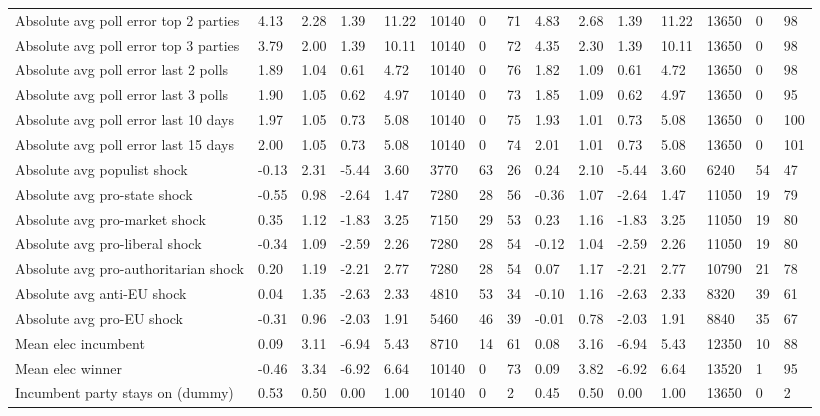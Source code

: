 \begin{longtable}{lllllllllllllll}
Absolute avg poll error top 2 parties & 4.13 & 2.28 & 1.39 & 11.22 & 10140 & 0 & 71 & 4.83 & 2.68 & 1.39 & 11.22 & 13650 & 0 & 98\\
Absolute avg poll error top 3 parties & 3.79 & 2.00 & 1.39 & 10.11 & 10140 & 0 & 72 & 4.35 & 2.30 & 1.39 & 10.11 & 13650 & 0 & 98\\
Absolute avg poll error last 2 polls & 1.89 & 1.04 & 0.61 & 4.72 & 10140 & 0 & 76 & 1.82 & 1.09 & 0.61 & 4.72 & 13650 & 0 & 98\\
\addlinespace
Absolute avg poll error last 3 polls & 1.90 & 1.05 & 0.62 & 4.97 & 10140 & 0 & 73 & 1.85 & 1.09 & 0.62 & 4.97 & 13650 & 0 & 95\\
Absolute avg poll error last 10 days & 1.97 & 1.05 & 0.73 & 5.08 & 10140 & 0 & 75 & 1.93 & 1.01 & 0.73 & 5.08 & 13650 & 0 & 100\\
Absolute avg poll error last 15 days & 2.00 & 1.05 & 0.73 & 5.08 & 10140 & 0 & 74 & 2.01 & 1.01 & 0.73 & 5.08 & 13650 & 0 & 101\\
Absolute avg populist shock & -0.13 & 2.31 & -5.44 & 3.60 & 3770 & 63 & 26 & 0.24 & 2.10 & -5.44 & 3.60 & 6240 & 54 & 47\\
Absolute avg pro-state shock & -0.55 & 0.98 & -2.64 & 1.47 & 7280 & 28 & 56 & -0.36 & 1.07 & -2.64 & 1.47 & 11050 & 19 & 79\\
\addlinespace
Absolute avg pro-market shock & 0.35 & 1.12 & -1.83 & 3.25 & 7150 & 29 & 53 & 0.23 & 1.16 & -1.83 & 3.25 & 11050 & 19 & 80\\
Absolute avg pro-liberal shock & -0.34 & 1.09 & -2.59 & 2.26 & 7280 & 28 & 54 & -0.12 & 1.04 & -2.59 & 2.26 & 11050 & 19 & 80\\
Absolute avg pro-authoritarian shock & 0.20 & 1.19 & -2.21 & 2.77 & 7280 & 28 & 54 & 0.07 & 1.17 & -2.21 & 2.77 & 10790 & 21 & 78\\
Absolute avg anti-EU shock & 0.04 & 1.35 & -2.63 & 2.33 & 4810 & 53 & 34 & -0.10 & 1.16 & -2.63 & 2.33 & 8320 & 39 & 61\\
Absolute avg pro-EU shock & -0.31 & 0.96 & -2.03 & 1.91 & 5460 & 46 & 39 & -0.01 & 0.78 & -2.03 & 1.91 & 8840 & 35 & 67\\
\addlinespace
Mean elec incumbent & 0.09 & 3.11 & -6.94 & 5.43 & 8710 & 14 & 61 & 0.08 & 3.16 & -6.94 & 5.43 & 12350 & 10 & 88\\
Mean elec winner & -0.46 & 3.34 & -6.92 & 6.64 & 10140 & 0 & 73 & 0.09 & 3.82 & -6.92 & 6.64 & 13520 & 1 & 95\\
Incumbent party stays on (dummy) & 0.53 & 0.50 & 0.00 & 1.00 & 10140 & 0 & 2 & 0.45 & 0.50 & 0.00 & 1.00 & 13650 & 0 & 2\\

\end{longtable}
